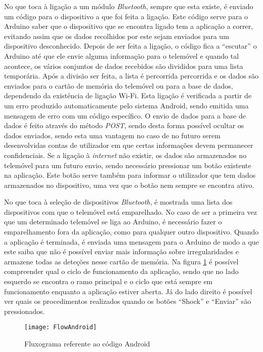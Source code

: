 No que toca à ligação a um módulo \emph{Bluetooth}, sempre que esta existe, é enviado um código para o dispositivo a que foi feita a ligação.
Este código serve para o Arduino saber que o dispositivo que se encontra ligado tem a aplicação a correr, evitando assim que os dados recolhidos por este sejam enviados para um dispositivo desconhecido.
Depois de ser feita a ligação, o código fica a ``escutar'' o Arduino até que ele envie alguma informação para o telemóvel e quando tal acontece, os vários conjuntos de dados  recebidos são divididos para uma lista temporária.
Após a divisão ser feita, a lista é percorrida percorrida e os dados são enviados para o cartão de memória do telemóvel ou para a base de dados, dependendo da existência de ligação Wi-Fi.
Esta ligação é verificada a partir de um erro produzido automaticamente pelo sistema Android, sendo emitida uma mensagem de erro com um código específico.
O envio de dados para a base de dados é feito através do método \emph{POST}, sendo desta forma possível ocultar os dados enviados, sendo esta uma vantagem no caso de no futuro serem desenvolvidas contas de utilizador em que certas informações devem permanecer confidenciais.
Se a ligação à \emph{internet} não existir, os dados são armazenados no telemóvel para um futuro envio, sendo necessário pressionar um botão existente na aplicação.
Este botão serve também para informar o utilizador que tem dados armazenados no dispositivo, uma vez que o botão nem sempre se encontra ativo.

No que toca à seleção de dispositivos \emph{Bluetooth}, é mostrada uma lista dos dispositivos com que o telemóvel está emparelhado.
No caso de ser a primeira vez que um determinado telemóvel se liga ao Arduino, é necessário fazer o emparelhamento fora da aplicação, como para qualquer outro dispositivo.
Quando a aplicação é terminada, é enviada uma mensagem para o Arduino de modo a que este saiba que não é possível enviar mais informação sobre irregularidades e armazene todas as deteções nesse cartão de memória.
Na figura \ref{fig:Fluxograma_referente_ao_código_android} é possível compreender qual o ciclo de funcionamento da aplicação, sendo que no lado esquerdo se encontra o ramo principal e o ciclo que está sempre em funcionamento enquanto a aplicação estiver aberta.
Já do lado direito é possível ver quais os procedimentos realizados quando os botões ``Shock'' e ``Enviar'' são pressionados.

\begin{figure}[hbtp]
	\centering
	\texttt{[image: FlowAndroid]}
	\caption{Fluxograma referente ao código Android}
	\label{fig:Fluxograma_referente_ao_código_android}
\end{figure}

